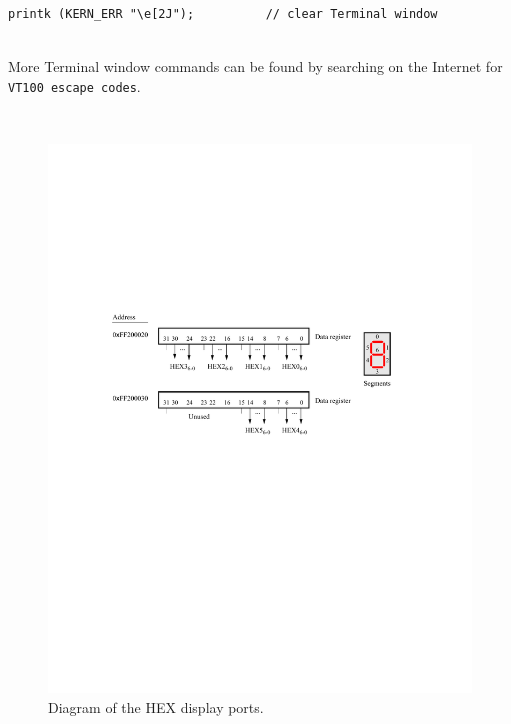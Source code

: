 \documentclass[epsfig,10pt,fullpage]{article}
\begin{document}
\begin{lstlisting}
printk (KERN_ERR "\e[2J");			// clear Terminal window
\end{lstlisting}

~\\
\noindent More Terminal window commands can be found by searching on the Internet for
\texttt{VT100 escape codes}.

~\\
\begin{figure}[H]
   \begin{center}
       \includegraphics{figures/fig_segment_port.pdf}
   \end{center}
   \caption{Diagram of the HEX display ports.}
	\label{fig:hex}
\end{figure}
\end{document}
